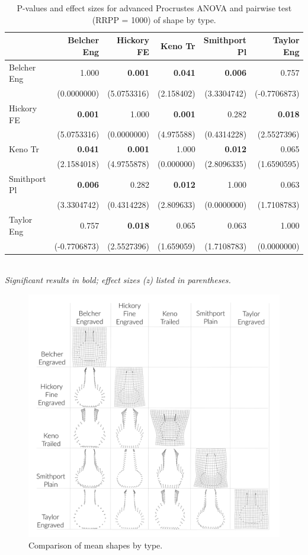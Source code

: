 \documentclass[review]{elsarticle}
\begin{document}
\begin{table}[htbp]\centering
\footnotesize
\caption{P-values and effect sizes for advanced Procrustes ANOVA and pairwise test (RRPP = 1000) of shape by type.}
\centering
\begin{tabular}{lrrrrr}
\toprule
 & Belcher Eng & Hickory FE & Keno Tr & Smithport Pl & Taylor Eng\\
\midrule
Belcher Eng & 1.000 & \textbf{0.001 }& \textbf{0.041} & \textbf{0.006} & 0.757\\
 & (0.0000000) & (5.0753316) & (2.158402) & (3.3304742) & (-0.7706873)\\
Hickory FE & \textbf{0.001} & 1.000 & \textbf{0.001} & 0.282 & \textbf{0.018}\\
 & (5.0753316) & (0.0000000) & (4.975588) & (0.4314228) & (2.5527396)\\
Keno Tr & \textbf{0.041} & \textbf{0.001} & 1.000 & \textbf{0.012} & 0.065\\
 & (2.1584018) & (4.9755878) & (0.000000) & (2.8096335) & (1.6590595)\\
Smithport Pl & \textbf{0.006} & 0.282 & \textbf{0.012} & 1.000 & 0.063\\
 & (3.3304742) & (0.4314228) & (2.809633) & (0.0000000) & (1.7108783)\\
Taylor Eng & 0.757 & \textbf{0.018} & 0.065 & 0.063 & 1.000\\
 & (-0.7706873) & (2.5527396) & (1.659059) & (1.7108783) & (0.0000000)\\
\bottomrule
\end{tabular}\\
\smallskip
\textit{Significant results in bold; effect sizes (z) listed in parentheses.}
\label{tab:Tbltypex}
\end{table}

\begin{figure}[ht]\centering
\includegraphics[width=\linewidth]{meancomp.jpg}
\caption{Comparison of mean shapes by type.}
\label{fig:FigMean}
\end{figure}
\end{document}
